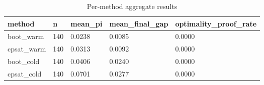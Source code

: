 \begin{table}[t]
\centering
\begin{tabular}{lllll}
\toprule
method & n & mean\_pi & mean\_final\_gap & optimality\_proof\_rate \\
\midrule
boot\_warm & 140 & 0.0238 & 0.0085 & 0.0000 \\
cpsat\_warm & 140 & 0.0313 & 0.0092 & 0.0000 \\
boot\_cold & 140 & 0.0406 & 0.0240 & 0.0000 \\
cpsat\_cold & 140 & 0.0701 & 0.0277 & 0.0000 \\
\bottomrule
\end{tabular}
\caption{Per-method aggregate results}
\label{tab:main-jssp}
\end{table}
